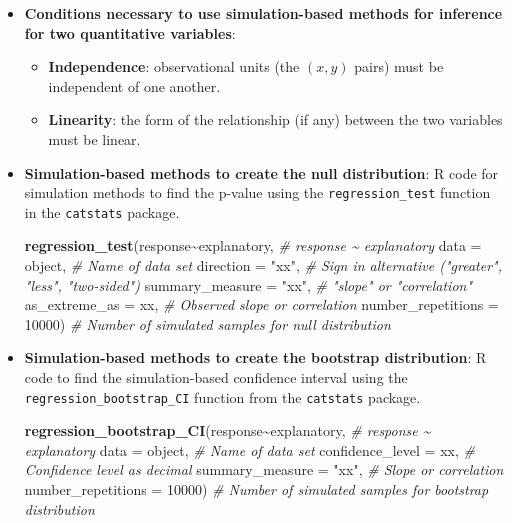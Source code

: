 \documentclass[
]{report}
\newenvironment{Shaded}{\begin{snugshade}}{\end{snugshade}}
\newcommand{\AttributeTok}[1]{\textcolor[rgb]{0.13,0.29,0.53}{#1}}
\newcommand{\CommentTok}[1]{\textcolor[rgb]{0.56,0.35,0.01}{\textit{#1}}}
\newcommand{\DecValTok}[1]{\textcolor[rgb]{0.00,0.00,0.81}{#1}}
\newcommand{\FunctionTok}[1]{\textcolor[rgb]{0.13,0.29,0.53}{\textbf{#1}}}
\newcommand{\NormalTok}[1]{#1}
\newcommand{\SpecialCharTok}[1]{\textcolor[rgb]{0.81,0.36,0.00}{\textbf{#1}}}
\newcommand{\StringTok}[1]{\textcolor[rgb]{0.31,0.60,0.02}{#1}}
\begin{document}
\begin{itemize}
\item
  \textbf{Conditions necessary to use simulation-based methods for inference for two quantitative variables}:

  \begin{itemize}
  \item
    \textbf{Independence}: observational units (the \((x, y)\) pairs) must be independent of one another.
  \item
    \textbf{Linearity}: the form of the relationship (if any) between the two variables must be linear.
  \end{itemize}
\item
  \textbf{Simulation-based methods to create the null distribution}: R code for simulation methods to find the p-value using the \texttt{regression\_test} function in the \texttt{catstats} package.

\begin{Shaded}
\begin{Highlighting}[]
\FunctionTok{regression\_test}\NormalTok{(response}\SpecialCharTok{\textasciitilde{}}\NormalTok{explanatory, }\CommentTok{\# response \textasciitilde{} explanatory}
           \AttributeTok{data =}\NormalTok{ object, }\CommentTok{\# Name of data set}
           \AttributeTok{direction =} \StringTok{"xx"}\NormalTok{, }\CommentTok{\# Sign in alternative ("greater", "less", "two{-}sided")}
           \AttributeTok{summary\_measure =} \StringTok{"xx"}\NormalTok{, }\CommentTok{\# "slope" or "correlation"}
           \AttributeTok{as\_extreme\_as =}\NormalTok{ xx, }\CommentTok{\# Observed slope or correlation}
           \AttributeTok{number\_repetitions =} \DecValTok{10000}\NormalTok{) }\CommentTok{\# Number of simulated samples for null distribution}
\end{Highlighting}
\end{Shaded}
\item
  \textbf{Simulation-based methods to create the bootstrap distribution}: R code to find the simulation-based confidence interval using the \texttt{regression\_bootstrap\_CI} function from the \texttt{catstats} package.

\begin{Shaded}
\begin{Highlighting}[]
\FunctionTok{regression\_bootstrap\_CI}\NormalTok{(response}\SpecialCharTok{\textasciitilde{}}\NormalTok{explanatory, }\CommentTok{\# response \textasciitilde{} explanatory}
   \AttributeTok{data =}\NormalTok{ object, }\CommentTok{\# Name of data set}
   \AttributeTok{confidence\_level =}\NormalTok{ xx, }\CommentTok{\# Confidence level as decimal}
   \AttributeTok{summary\_measure =} \StringTok{"xx"}\NormalTok{, }\CommentTok{\# Slope or correlation}
   \AttributeTok{number\_repetitions =} \DecValTok{10000}\NormalTok{) }\CommentTok{\# Number of simulated samples for bootstrap distribution}
\end{Highlighting}
\end{Shaded}
\end{itemize}
\end{document}
